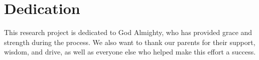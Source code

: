 \label{dedication}

\chapter*{Dedication}
This research project is dedicated to God Almighty, who has provided grace and strength during the process. We also want to thank our parents for their support, wisdom, and drive, as well as everyone else who helped make this effort a success. 
